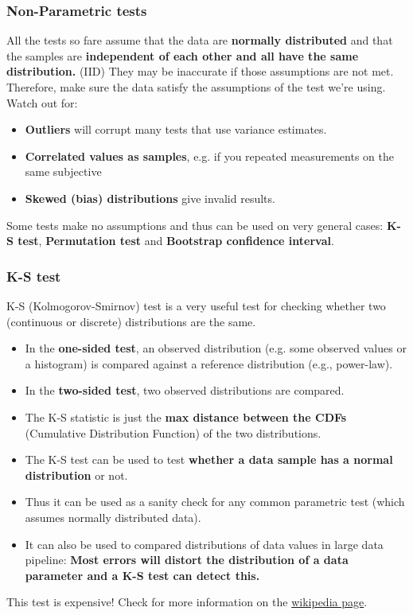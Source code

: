\subsubsection{Non-Parametric tests}

All the tests so fare assume that the data are {\bf normally distributed} and that the samples are {\bf independent of each other and all have the same distribution.} (IID) They may be inaccurate if those assumptions are not met. Therefore, make sure the data satisfy the assumptions of the test we're using. Watch out for:
\begin{itemize}
 \item \textbf{Outliers} will corrupt many tests that use variance estimates.
 \item \textbf{Correlated values as samples}, e.g. if you repeated measurements on the same subjective
 \item \textbf{Skewed (bias) distributions} give invalid results.
\end{itemize}

Some tests make no assumptions and thus can be used on very general cases: \textbf{K-S test}, \textbf{Permutation test} and \textbf{Bootstrap confidence interval}.


\subsubsection{K-S test}
K-S (Kolmogorov-Smirnov) test is a very useful test for checking whether two (continuous or discrete) distributions are the same. 
\begin{itemize}
 \item In the {\bf one-sided test}, an observed distribution (e.g. some observed values or a histogram) is compared against a reference distribution (e.g., power-law).
 \item In the {\bf two-sided test}, two observed distributions are compared.
 \item The K-S statistic is just the {\bf max distance between the CDFs} (Cumulative Distribution Function) of the two distributions.
 \item The K-S test can be used to test {\bf whether a data sample has  a normal distribution} or not.
 \item Thus it can be used as a sanity check for any common parametric test (which assumes normally distributed data).
 \item It can also be used to compared distributions of data values in large data pipeline: {\bf Most errors will distort the distribution of a data parameter and a K-S test can detect this.}
\end{itemize}
This test is expensive! Check for more information on the \href{https://en.wikipedia.org/wiki/Kolmogorov?Smirnov_test}{wikipedia page}.
